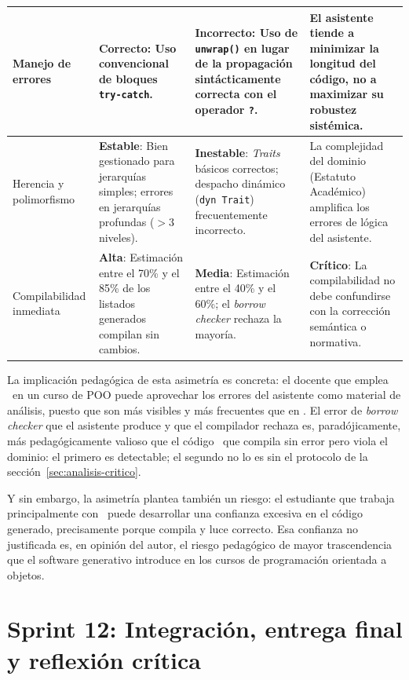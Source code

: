 \begin{longtable}{@{} L{3cm} L{3.8cm} L{3.8cm} L{3.2cm} @{} }
	Manejo de errores & 
	\textbf{Correcto}: Uso convencional de bloques \texttt{try-catch}. & 
	\textbf{Incorrecto}: Uso de \texttt{unwrap()} en lugar de la propagación sintácticamente correcta con el operador \texttt{?}. & 
	El asistente tiende a minimizar la longitud del código, no a maximizar su robustez sistémica. \\
	\midrule
	
	Herencia y polimorfismo & 
	\textbf{Estable}: Bien gestionado para jerarquías simples; errores en jerarquías profundas ($>3$ niveles). & 
	\textbf{Inestable}: \textit{Traits} básicos correctos; despacho dinámico (\texttt{dyn Trait}) frecuentemente incorrecto. & 
	La complejidad del dominio (Estatuto Académico) amplifica los errores de lógica del asistente. \\
	\midrule
	
	Compilabilidad inmediata & 
	\textbf{Alta}: Estimación entre el 70\% y el 85\% de los listados generados compilan sin cambios. & 
	\textbf{Media}: Estimación entre el 40\% y el 60\%; el \textit{borrow checker} rechaza la mayoría. & 
	\textbf{Crítico}: La compilabilidad no debe confundirse con la corrección semántica o normativa. \\
\end{longtable}
\endgroup

La implicación pedagógica de esta asimetría es concreta: el docente que emplea
\rust\ en un curso de POO puede aprovechar los errores del asistente como
material de análisis, puesto que son más visibles y más frecuentes que en \java.
El error de \textit{borrow checker} que el asistente produce y que el
compilador rechaza es, paradójicamente, más pedagógicamente valioso que el
código \java\ que compila sin error pero viola el dominio: el primero es
detectable; el segundo no lo es sin el protocolo de la
sección~\ref{sec:analisis-critico}.

Y sin embargo, la asimetría plantea también un riesgo: el estudiante que trabaja
principalmente con \java\ puede desarrollar una confianza excesiva en el código
generado, precisamente porque compila y luce correcto. Esa confianza no justificada
es, en opinión del autor, el riesgo pedagógico de mayor trascendencia que el
software generativo introduce en los cursos de programación orientada a objetos.

\section*{Sprint 12: Integración, entrega final y reflexión crítica}
\label{sprint:12}

